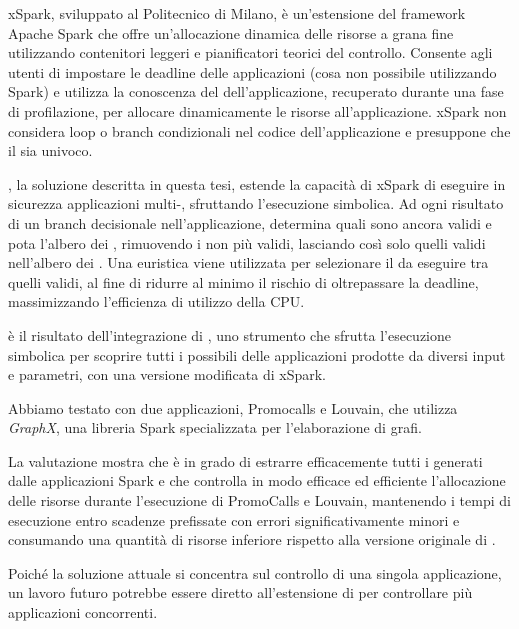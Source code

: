 xSpark, sviluppato al Politecnico di Milano, è un'estensione del framework Apache Spark che offre un'allocazione dinamica delle risorse a grana fine utilizzando contenitori leggeri e pianificatori teorici del controllo. Consente agli utenti di impostare le deadline delle applicazioni (cosa non  possibile utilizzando Spark) e utilizza la conoscenza del \plan dell'applicazione, recuperato durante una fase di profilazione, per allocare dinamicamente le risorse all'applicazione.
xSpark non considera loop o branch condizionali nel codice dell'applicazione e presuppone che il  \plan sia univoco.

\tool, la soluzione descritta in questa tesi, estende la capacità di xSpark di eseguire in sicurezza applicazioni multi-\plan, sfruttando l'esecuzione simbolica. Ad ogni risultato di un branch decisionale nell'applicazione, \tool determina quali \plans sono ancora validi e pota l'albero dei \plans, rimuovendo i \plans non più validi, lasciando così solo quelli validi nell'albero dei \plans. Una euristica viene utilizzata per selezionare il \plan da eseguire tra quelli validi, al fine di ridurre al minimo il rischio di oltrepassare la deadline, massimizzando l'efficienza di utilizzo della CPU.

\tool è il risultato dell'integrazione di \dSymb, uno strumento che sfrutta l'esecuzione simbolica per scoprire tutti i possibili {\plan} delle applicazioni prodotte da diversi input e parametri, con una versione modificata di xSpark.

Abbiamo testato \tool con due applicazioni, Promocalls e Louvain, che utilizza \textit{GraphX}, una libreria Spark specializzata per l'elaborazione di grafi.

La valutazione mostra che \approach è in grado di estrarre efficacemente tutti i \plans generati dalle applicazioni Spark e che \tool controlla in modo efficace ed efficiente l'allocazione delle risorse durante l'esecuzione di PromoCalls e Louvain, mantenendo i tempi di esecuzione entro scadenze prefissate con errori significativamente minori e consumando una quantità di risorse inferiore rispetto alla versione originale di \cSpark.

Poiché la soluzione attuale si concentra sul controllo di una singola applicazione, un lavoro futuro potrebbe essere diretto all'estensione di \tool per controllare più applicazioni concorrenti.

\endgroup